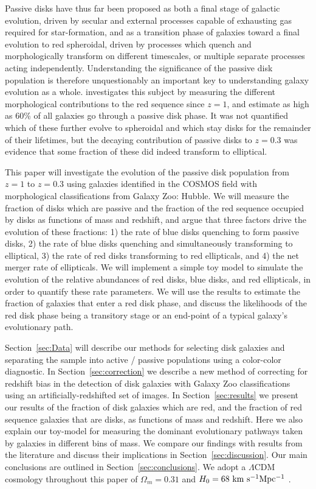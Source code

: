 \documentclass[useAMS,usenatbib]{mn2e}
\begin{document}
Passive disks have thus far been proposed as both a final stage of galactic evolution, driven by secular and external processes capable of exhausting gas required for star-formation, and as a transition phase of galaxies toward a final evolution to red spheroidal, driven by processes which quench and morphologically transform on different timescales, or multiple separate processes acting independently. Understanding the significance of the passive disk population is therefore unquestionably an important key to understanding galaxy evolution as a whole. \citet{Bundy2010} investigates this subject by measuring the different morphological contributions to the red sequence since $z=1$, and estimate as high as 60\% of all galaxies go through a passive disk phase. It was not quantified which of these further evolve to spheroidal and which stay disks for the remainder of their lifetimes, but the decaying contribution of passive disks to $z=0.3$ was evidence that some fraction of these did indeed transform to elliptical.

This paper will investigate the evolution of the passive disk population from $z=1$ to $z=0.3$ using galaxies identified in the COSMOS field with morphological classifications from Galaxy Zoo: Hubble. We will measure the fraction of disks which are passive and the fraction of the red sequence occupied by disks as functions of mass and redshift, and argue that three factors drive the evolution of these fractions: 1) the rate of blue disks quenching to form passive disks, 2) the rate of blue disks quenching and simultaneously transforming to elliptical, 3) the rate of red disks transforming to red ellipticals, and 4) the net merger rate of ellipticals. We will implement a simple toy model to simulate the evolution of the relative abundances of red disks, blue disks, and red ellipticals, in order to quantify these rate parameters. We will use the results to estimate the fraction of galaxies that enter a red disk phase, and discuss the likelihoods of the red disk phase being a transitory stage or an end-point of a typical galaxy's evolutionary path.

Section~\ref{sec:Data} will describe our methods for selecting disk galaxies and separating the sample into active / passive populations using a color-color diagnostic. In Section~\ref{sec:correction} we describe a new method of correcting for redshift bias in the detection of disk galaxies with Galaxy Zoo classifications using an artificially-redshifted set of images. In Section~\ref{sec:results} we present our results of the fraction of disk galaxies which are red, and the fraction of red sequence galaxies that are disks, as functions of mass and redshift. Here we also explain our toy-model for measuring the dominant evolutionary pathways taken by galaxies in different bins of mass. We compare our findings with results from the literature and discuss their implications in Section~\ref{sec:discussion}. Our main conclusions are outlined in Section~\ref{sec:conclusions}. We adopt a $\Lambda$CDM cosmology throughout this paper of $\Omega_m=0.31$ and $H_0=68~\rm km~s^{-1} Mpc^{-1}$ \citep{PlanckCollaboration2015}.
\end{document}
